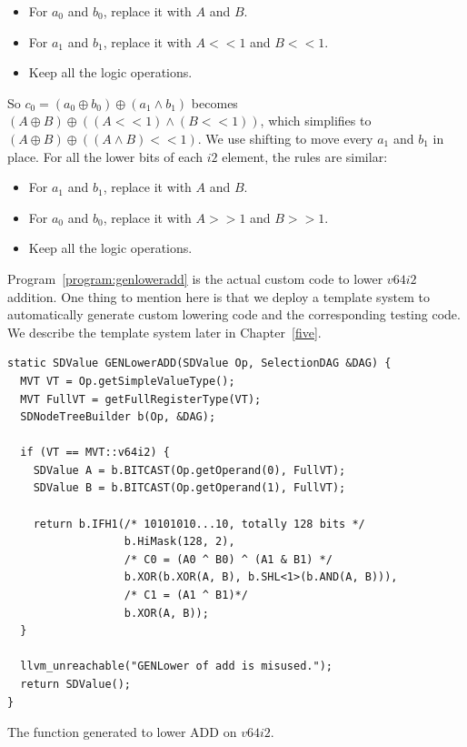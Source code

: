 \begin{itemize}
    \item For $a_0$ and $b_0$, replace it with $A$ and $B$.
    \item For $a_1$ and $b_1$, replace it with $A << 1$ and $B << 1$.
    \item Keep all the logic operations.
\end{itemize}

So $c_0 = (a_0 \oplus b_0) \oplus (a_1 \land b_1)$ becomes $(A \oplus B) \oplus ((A << 1) \land (B << 1))$, which simplifies to $(A \oplus B) \oplus ((A \land B) << 1)$. We use shifting to move every $a_1$ and $b_1$ in place. For all the lower bits of each $i2$ element, the rules are similar:

\begin{itemize}
    \item For $a_1$ and $b_1$, replace it with $A$ and $B$.
    \item For $a_0$ and $b_0$, replace it with $A >> 1$ and $B >> 1$.
    \item Keep all the logic operations.
\end{itemize}

Program~\ref{program:genloweradd} is the actual custom code to lower $v64i2$ addition. One thing to mention here is that we deploy a template system to automatically generate custom lowering code and the corresponding testing code. We describe the template system later in Chapter~\ref{five}.

\begin{program}
\begin{verbatim}
static SDValue GENLowerADD(SDValue Op, SelectionDAG &DAG) {
  MVT VT = Op.getSimpleValueType();
  MVT FullVT = getFullRegisterType(VT);
  SDNodeTreeBuilder b(Op, &DAG);

  if (VT == MVT::v64i2) {
    SDValue A = b.BITCAST(Op.getOperand(0), FullVT);
    SDValue B = b.BITCAST(Op.getOperand(1), FullVT);

    return b.IFH1(/* 10101010...10, totally 128 bits */
                  b.HiMask(128, 2),
                  /* C0 = (A0 ^ B0) ^ (A1 & B1) */
                  b.XOR(b.XOR(A, B), b.SHL<1>(b.AND(A, B))),
                  /* C1 = (A1 ^ B1)*/
                  b.XOR(A, B));
  }

  llvm_unreachable("GENLower of add is misused.");
  return SDValue();
}
\end{verbatim}
\caption{The function generated to lower ADD on $v64i2$.}
\label{program:genloweradd}
\end{program}


